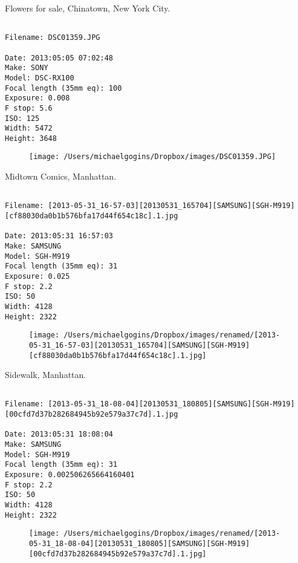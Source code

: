 \clearpage
\onecolumn
\noindent Flowers for sale, Chinatown, New York City.
\noindent
\begin{lstlisting}

Filename: DSC01359.JPG

Date: 2013:05:05 07:02:48
Make: SONY
Model: DSC-RX100
Focal length (35mm eq): 100
Exposure: 0.008
F stop: 5.6
ISO: 125
Width: 5472
Height: 3648
\end{lstlisting}
\clearpage

\begin{figure}
\texttt{[image: /Users/michaelgogins/Dropbox/images/DSC01359.JPG]}
\end{figure}
    
\clearpage
\onecolumn
\noindent Midtown Comics, Manhattan.
\noindent
\begin{lstlisting}

Filename: [2013-05-31_16-57-03][20130531_165704][SAMSUNG][SGH-M919][cf88030da0b1b576bfa17d44f654c18c].1.jpg

Date: 2013:05:31 16:57:03
Make: SAMSUNG
Model: SGH-M919
Focal length (35mm eq): 31
Exposure: 0.025
F stop: 2.2
ISO: 50
Width: 4128
Height: 2322
\end{lstlisting}
\clearpage

\begin{figure}
\texttt{[image: /Users/michaelgogins/Dropbox/images/renamed/[2013-05-31\_16-57-03][20130531\_165704][SAMSUNG][SGH-M919][cf88030da0b1b576bfa17d44f654c18c].1.jpg]}
\end{figure}
    
\clearpage
\onecolumn
\noindent Sidewalk, Manhattan.
\noindent
\begin{lstlisting}

Filename: [2013-05-31_18-08-04][20130531_180805][SAMSUNG][SGH-M919][00cfd7d37b282684945b92e579a37c7d].1.jpg

Date: 2013:05:31 18:08:04
Make: SAMSUNG
Model: SGH-M919
Focal length (35mm eq): 31
Exposure: 0.002506265664160401
F stop: 2.2
ISO: 50
Width: 4128
Height: 2322
\end{lstlisting}
\clearpage

\begin{figure}
\texttt{[image: /Users/michaelgogins/Dropbox/images/renamed/[2013-05-31\_18-08-04][20130531\_180805][SAMSUNG][SGH-M919][00cfd7d37b282684945b92e579a37c7d].1.jpg]}
\end{figure}
    
